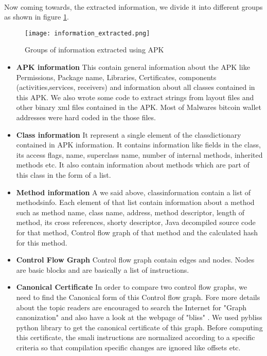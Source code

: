\documentclass[../main.tex]{subfile}
\begin{document}
		\paragraph{} Now coming towards, the extracted information, we divide it into different groups as shown in figure \ref{fig:info_extracted}.
		
		\begin{figure}
			\texttt{[image: information\_extracted.png]}
			\caption{Groups of information extracted using APK}
			\label{fig:info_extracted}
		\end{figure}
		
		
		\begin{itemize}
			\item \textbf{APK information} This contain general information about the APK like Permissions, Package name, Libraries, Certificates, components (activities,services, receivers) and information about all classes contained in this APK. We also wrote some code to extract strings from layout files and other binary xml files contained in the APK. Most of Malwares bitcoin wallet addresses were hard coded in the those files.
			\item \textbf{Class information} It represent a single element of the class\textunderscore dictionary contained in APK information. It contains information like fields in the class, its access flags, name, superclass name, number of internal methods, inherited methods etc. It also contain information about methods which are part of this class in the form of a list.
			\item \textbf{Method information} A we said above, class\textunderscore information contain a list of methods\textunderscore info. Each element of that list contain information about a method such as method name, class name, address, method descriptor, length of method, its cross references, shorty descriptor, Java decompiled source code for that method, Control flow graph of that method and the calculated hash for this method.
			\item \textbf{Control Flow Graph} Control flow graph contain edges and nodes. Nodes are basic blocks and are basically a list of instructions.
			\item \textbf{Canonical Certificate} In order to compare two control flow graphs, we need to find the Canonical form of this Control flow graph. Fore more details about the topic readers are encouraged to search the Internet for "Graph canonization" and also have a look at the webpage of "bliss" \cite{bliss}. We used pybliss python library \cite{bliss} \cite{junttila2007engineering} to get the canonical certificate of this graph. Before computing this certificate, the smali instructions are normalized according to a specific criteria so that compilation specific changes are ignored like offsets etc.
		\end{itemize}
		
\end{document}
